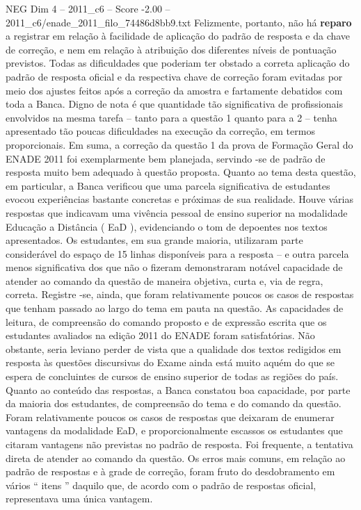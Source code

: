 \begin{textsample}{NEG Dim 4 – 2011\_c6 – Score -2.00 – 2011\_c6/enade\_2011\_filo\_74486d8bb9.txt}
Felizmente, portanto, não há \textbf{reparo} a registrar em relação à facilidade de aplicação do padrão de resposta e da chave de correção, e nem em relação à atribuição dos diferentes níveis de pontuação previstos.
Todas as dificuldades que poderiam ter obstado a correta aplicação do padrão de resposta oficial e da respectiva chave de correção foram evitadas por meio dos ajustes feitos após a correção da amostra e fartamente debatidos com toda a Banca.
Digno de nota é que quantidade tão significativa de profissionais envolvidos na mesma tarefa – tanto para a questão 1 quanto para a 2 – tenha apresentado tão poucas dificuldades na execução da correção, em termos proporcionais.
Em suma, a correção da questão 1 da prova de Formação Geral do ENADE 2011 foi exemplarmente bem planejada, servindo -se de padrão de resposta muito bem adequado à questão proposta.
Quanto ao tema desta questão, em particular, a Banca verificou que uma parcela significativa de estudantes evocou experiências bastante concretas e próximas de sua realidade.
Houve várias respostas que indicavam uma vivência pessoal de ensino superior na modalidade Educação a Distância ( EaD ), evidenciando o tom de depoentes nos textos apresentados.
Os estudantes, em sua grande maioria, utilizaram parte considerável do espaço de 15 linhas disponíveis para a resposta – e outra parcela menos significativa dos que não o fizeram demonstraram notável capacidade de atender ao comando da questão de maneira objetiva, curta e, via de regra, correta.
Registre -se, ainda, que foram relativamente poucos os casos de respostas que tenham passado ao largo do tema em pauta na questão.
As capacidades de leitura, de compreensão do comando proposto e de expressão escrita que os estudantes avaliados na edição 2011 do ENADE foram satisfatórias.
Não obstante, seria leviano perder de vista que a qualidade dos textos redigidos em resposta às questões discursivas do Exame ainda está muito aquém do que se espera de concluintes de cursos de ensino superior de todas as regiões do país.
Quanto ao conteúdo das respostas, a Banca constatou boa capacidade, por parte da maioria dos estudantes, de compreensão do tema e do comando da questão.
Foram relativamente poucos os casos de respostas que deixaram de enumerar vantagens da modalidade EaD, e proporcionalmente escassos os estudantes que citaram vantagens não previstas no padrão de resposta.
Foi frequente, a tentativa direta de atender ao comando da questão.
Os erros mais comuns, em relação ao padrão de respostas e à grade de correção, foram fruto do desdobramento em vários “ itens ” daquilo que, de acordo com o padrão de respostas oficial, representava uma única vantagem.

\end{textsample}
